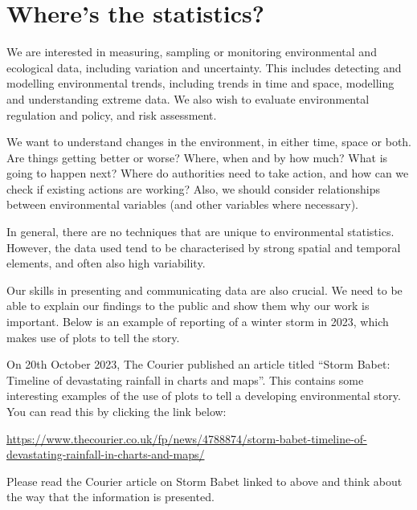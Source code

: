 \documentclass[
  letterpaper,
  DIV=11,
  numbers=noendperiod]{scrartcl}
\begin{document}
\section{Where's the statistics?}\label{wheres-the-statistics}

We are interested in measuring, sampling or monitoring environmental and
ecological data, including variation and uncertainty. This includes
detecting and modelling environmental trends, including trends in time
and space, modelling and understanding extreme data. We also wish to
evaluate environmental regulation and policy, and risk assessment.

We want to understand changes in the environment, in either time, space
or both. Are things getting better or worse? Where, when and by how
much? What is going to happen next? Where do authorities need to take
action, and how can we check if existing actions are working? Also, we
should consider relationships between environmental variables (and other
variables where necessary).

In general, there are no techniques that are unique to environmental
statistics. However, the data used tend to be characterised by strong
spatial and temporal elements, and often also high variability.

Our skills in presenting and communicating data are also crucial. We
need to be able to explain our findings to the public and show them why
our work is important. Below is an example of reporting of a winter
storm in 2023, which makes use of plots to tell the story.

\begin{tcolorbox}[enhanced jigsaw, left=2mm, toprule=.15mm, rightrule=.15mm, coltitle=black, arc=.35mm, colframe=quarto-callout-note-color-frame, breakable, bottomtitle=1mm, colback=white, titlerule=0mm, toptitle=1mm, title={The Courier article on Storm Babet}, bottomrule=.15mm, colbacktitle=quarto-callout-note-color!10!white, opacitybacktitle=0.6, opacityback=0, leftrule=.75mm]

On 20th October 2023, The Courier published an article titled ``Storm
Babet: Timeline of devastating rainfall in charts and maps''. This
contains some interesting examples of the use of plots to tell a
developing environmental story. You can read this by clicking the link
below:

\url{https://www.thecourier.co.uk/fp/news/4788874/storm-babet-timeline-of-devastating-rainfall-in-charts-and-maps/}

Please read the Courier article on Storm Babet linked to above and think
about the way that the information is presented.

\end{tcolorbox}
\end{document}
